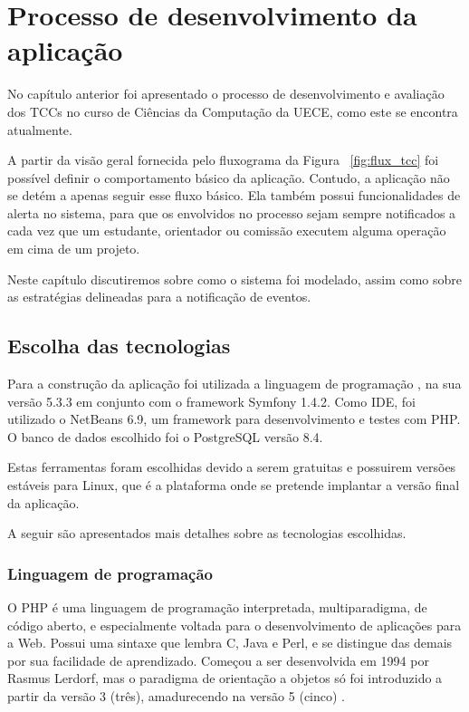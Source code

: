 \chapter{Processo de desenvolvimento da aplicação}
\label{cha:desenvolvimento}

No capítulo anterior foi apresentado o processo de desenvolvimento
e avaliação dos TCCs no curso de Ciências da Computação da UECE, como este se 
encontra atualmente. 

A partir da visão geral fornecida pelo fluxograma 
da Figura ~\ref{fig:flux_tcc} foi possível definir o comportamento básico 
da aplicação. Contudo, a aplicação não se 
detém a apenas seguir esse fluxo básico. Ela também possui funcionalidades
de alerta no sistema, para que os envolvidos no processo sejam sempre 
notificados a cada vez que um estudante, orientador ou comissão executem alguma
operação em cima de um projeto.

Neste capítulo discutiremos sobre como o sistema foi modelado, assim como sobre as
estratégias delineadas para a notificação de eventos.

\section{Escolha das tecnologias}
Para a construção da aplicação foi utilizada a linguagem de programação , na 
sua versão 5.3.3 em conjunto com o framework Symfony 1.4.2. Como IDE, foi utilizado 
o NetBeans 6.9, um framework para desenvolvimento e testes com PHP. O 
banco de dados escolhido foi o PostgreSQL versão 8.4.

Estas ferramentas foram escolhidas devido a serem gratuitas e possuirem versões 
estáveis para Linux, que é a plataforma onde se pretende implantar a versão 
final da aplicação. 

A seguir são apresentados mais detalhes sobre as tecnologias escolhidas.

\label{tecnologias}
\subsection{Linguagem de programação}
O PHP é uma linguagem de programação interpretada, multiparadigma, de código aberto, e especialmente
voltada para o desenvolvimento de aplicações para a Web. Possui uma sintaxe que lembra
C, Java e Perl, e se distingue das demais por sua facilidade de aprendizado.
Começou a ser desenvolvida em 1994 por Rasmus Lerdorf, mas o paradigma de orientação
a objetos só foi introduzido a partir da versão 3 (três), amadurecendo na versão 5 (cinco) \cite{PHP, Wiki:PHP}.


